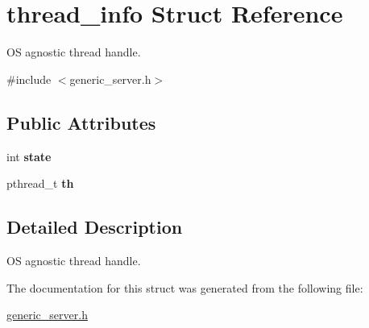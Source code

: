 \hypertarget{structthread__info}{\section{thread\-\_\-info Struct Reference}
\label{structthread__info}
}


O\-S agnostic thread handle.  




{\ttfamily \#include $<$generic\-\_\-server.\-h$>$}

\subsection*{Public Attributes}
\begin{DoxyCompactItemize}
\item 
\hypertarget{structthread__info_a48387b7825fe93c24e0fa3bd99c0bc7b}{int {\bfseries state}}\label{structthread__info_a48387b7825fe93c24e0fa3bd99c0bc7b}

\item 
\hypertarget{structthread__info_a438877198c4ffdddf6379ece95af88a5}{pthread\-\_\-t {\bfseries th}}\label{structthread__info_a438877198c4ffdddf6379ece95af88a5}

\end{DoxyCompactItemize}


\subsection{Detailed Description}
O\-S agnostic thread handle. 

The documentation for this struct was generated from the following file\-:\begin{DoxyCompactItemize}
\item 
\hyperlink{generic__server_8h}{generic\-\_\-server.\-h}\end{DoxyCompactItemize}
